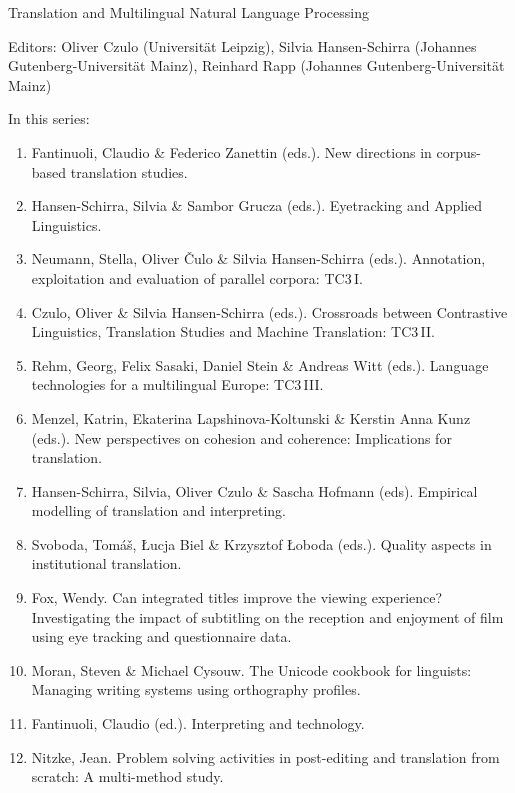 {\large Translation and Multilingual Natural Language Processing}

\bigskip

Editors: Oliver Czulo (Universität Leipzig),
Silvia Hansen-Schirra (Johannes Gutenberg-Universität Mainz),
Reinhard Rapp (Johannes Gutenberg-Universität Mainz)

\bigskip

In this series:

\begin{enumerate}
\item Fantinuoli, Claudio \& Federico Zanettin (eds.). New directions in corpus-based translation studies.
\item Hansen-Schirra, Silvia \& Sambor Grucza (eds.). Eyetracking and Applied Linguistics.
\item Neumann, Stella, Oliver Čulo \& Silvia Hansen-Schirra (eds.). Annotation, exploitation and evaluation of parallel corpora: TC3\,I.
\item Czulo, Oliver  \& Silvia Hansen-Schirra (eds.). Crossroads between Contrastive Linguistics, Translation Studies and Machine Translation: TC3\,II.
\item Rehm, Georg, Felix Sasaki, Daniel Stein \& Andreas Witt (eds.). Language technologies for a multilingual Europe: TC3\,III.
\item Menzel, Katrin, Ekaterina Lapshinova-Koltunski \& Kerstin Anna Kunz  (eds.). New perspectives on cohesion and coherence: Implications for translation.
\item Hansen-Schirra, Silvia, Oliver Czulo \& Sascha Hofmann (eds). Empirical modelling of translation and interpreting.
\item Svoboda, Tomáš, Łucja Biel \& Krzysztof Łoboda (eds.). Quality aspects in institutional translation.
\item Fox, Wendy. Can integrated titles improve the viewing experience? Investigating the impact of subtitling on the reception and enjoyment of film using eye tracking and questionnaire data.
\item Moran, Steven \& Michael Cysouw. The Unicode cookbook for linguists: Managing writing systems using orthography profiles.
\item Fantinuoli, Claudio (ed.). Interpreting and technology.
\item Nitzke, Jean. Problem solving activities in post-editing and translation from scratch: A multi-method study.
\end{enumerate}
